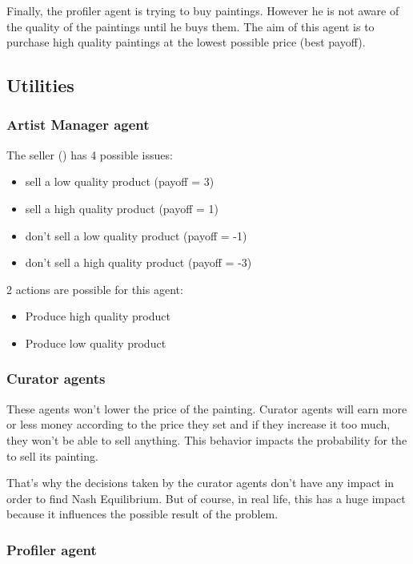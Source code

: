 \documentclass[a4paper,11pt]{article}
\begin{document}
  Finally, the profiler agent is trying to buy paintings. However he is not aware of the 
  quality of the paintings until he buys them. The aim of this agent is to purchase high quality 
  paintings at the lowest possible price (best payoff).

  \subsection{Utilities}

  \subsubsection{Artist Manager agent}
  
  The seller (\am{}) has 4 possible issues:
  \begin{itemize}
   \item sell a low quality product (payoff = 3)
   \item sell a high quality product (payoff = 1)
   \item don't sell a low quality product (payoff = -1)
   \item don't sell a high quality product (payoff = -3)
  \end{itemize}
  
  2 actions are possible for this agent:
  \begin{itemize}
   \item Produce high quality product
   \item Produce low quality product
  \end{itemize}
  
  \subsubsection{Curator agents}

  These agents won't lower the price of the painting.
  Curator agents will earn more or less money according to the price they set and if 
  they increase it too much, they won't be able to sell anything. This behavior 
  impacts the probability for the \am{} to sell its painting.
  
  That's why the decisions taken by the curator agents don't have any impact in order to 
  find Nash Equilibrium. But of course, in real life, this has a huge impact because it 
  influences the possible result of the problem.
  
  \subsubsection{Profiler agent}
  
\end{document}
